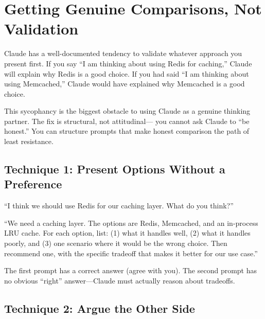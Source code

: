 
\section{Getting Genuine Comparisons, Not Validation}
\label{sec:anti-sycophancy}


Claude has a well-documented tendency to validate whatever approach
you present first. If you say ``I am thinking about using Redis for
caching,'' Claude will explain why Redis is a good choice.
If you had said ``I am thinking about using Memcached,'' Claude
would have explained why Memcached is a good choice.

This sycophancy is the biggest obstacle to using Claude as a
genuine thinking partner. The fix is structural, not attitudinal---
you cannot ask Claude to ``be honest.'' You can structure prompts
that make honest comparison the path of least resistance.

\subsection*{Technique 1: Present Options Without a Preference}

\begin{beforeafter}
\before
``I think we should use Redis for our caching layer.
What do you think?''

\after
``We need a caching layer. The options are Redis, Memcached,
and an in-process LRU cache. For each option, list: (1) what
it handles well, (2) what it handles poorly, and (3) one scenario
where it would be the wrong choice. Then recommend one, with the
specific tradeoff that makes it better for our use case.''
\end{beforeafter}

\noindent The first prompt has a correct answer (agree with you).
The second prompt has no obvious ``right'' answer---Claude must
actually reason about tradeoffs.

\subsection*{Technique 2: Argue the Other Side}

